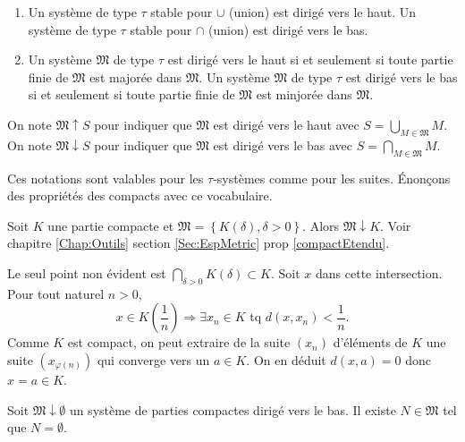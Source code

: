 \begin{rems}
 \begin{enumerate}
  \item Un système de type $\tau$ stable pour $\cup$ (union) est dirigé vers le haut. Un système de type $\tau$ stable pour $\cap$ (union) est dirigé vers le bas.
  \item Un système $\mathfrak{M}$ de type $\tau$ est dirigé vers le haut si et seulement si toute partie finie de $\mathfrak{M}$ est majorée dans $\mathfrak{M}$. Un système $\mathfrak{M}$ de type $\tau$ est dirigé vers le bas si et seulement si toute partie finie de $\mathfrak{M}$ est minjorée dans $\mathfrak{M}$.
 \end{enumerate}
\end{rems}
\begin{defin}\label{Def:limMonotone}
  On note $\mathfrak{M}\uparrow S$ pour indiquer que $\mathfrak{M}$ est dirigé vers le haut avec $S = \bigcup_{M \in \mathfrak{M}}M$.\newline
  On note $\mathfrak{M}\downarrow S$ pour indiquer que $\mathfrak{M}$ est dirigé vers le bas avec $S = \bigcap_{M \in \mathfrak{M}}M$.
\end{defin}
\noindent Ces notations sont valables pour les $\tau$-systèmes comme pour les suites. Énonçons des propriétés des compacts avec ce vocabulaire.
\begin{exple} \label{systAproxCompact}
 Soit $K$ une partie compacte et $\mathfrak{M} = \left\lbrace K(\delta), \delta >0  \right\rbrace$. Alors $\mathfrak{M} \downarrow K$. Voir chapitre \ref{Chap:Outils} section \ref{Sec:EspMetric} prop  \ref{compactEtendu}.
\end{exple}
\begin{demo}
 Le seul point non évident est $\bigcap_{\delta > 0} K(\delta) \subset K$. Soit $x$ dans cette intersection. Pour tout naturel $n>0$,
 \begin{displaymath}
  x \in K(\frac{1}{n}) \Rightarrow \exists x_n \in K \text{ tq } d(x,x_n) < \frac{1}{n}.
 \end{displaymath}
Comme $K$ est compact, on peut extraire de la suite $(x_n)$ d'éléments de $K$ une suite $(x_{\varphi(n)})$ qui converge vers un $a\in K$. On en déduit $d(x,a)=0$ donc $x=a \in K$.
\end{demo}
\begin{propn}\label{FamDecCompacts}
 Soit $\mathfrak{M}\downarrow \emptyset$ un système de parties compactes dirigé vers le bas. Il existe $N \in \mathfrak{M}$ tel que $N = \emptyset$.
\end{propn}
